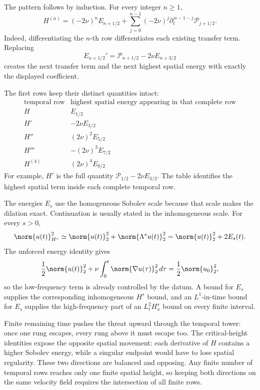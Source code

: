 The pattern follows by induction.
For every integer \(n\geq1\),
\[
  H^{(n)}
  =
  (-2\nu)^nE_{n+1/2}
  +
  \sum_{j=0}^{n-1}
  (-2\nu)^j
  \partial_t^{\,n-1-j}\mathcal P_{j+1/2}.
\]
Indeed, differentiating the \(n\)-th row differentiates each existing transfer term.
Replacing
\[
  E_{n+1/2}'
  =
  \mathcal P_{n+1/2}
  -2\nu E_{n+3/2}
\]
creates the next transfer term and the next highest spatial energy with exactly the displayed coefficient.

The first rows keep their distinct quantities intact:
\[
  \begin{array}{c|c}
    \text{temporal row}
    &
    \text{highest spatial energy appearing in that complete row}
    \\
    \hline
    H
    &
    E_{1/2}
    \\
    H'
    &
    -2\nu E_{3/2}
    \\
    H''
    &
    (2\nu)^2E_{5/2}
    \\
    H'''
    &
    -(2\nu)^3E_{7/2}
    \\
    H^{(4)}
    &
    (2\nu)^4E_{9/2}
  \end{array}
\]
For example, \(H'\) is the full quantity \(\mathcal P_{1/2}-2\nu E_{3/2}\).
The table identifies the highest spatial term inside each complete temporal row.

The energies \(E_s\) use the homogeneous Sobolev scale because that scale makes the dilation exact.
Continuation is usually stated in the inhomogeneous scale.
For every \(s>0\),
\[
  \norm{u(t)}_{H^s}^2
  \simeq
  \norm{u(t)}_2^2
  +
  \norm{\Lambda^su(t)}_2^2
  =
  \norm{u(t)}_2^2+2E_s(t).
\]
The unforced energy identity gives
\[
  \frac12\norm{u(t)}_2^2
  +
  \nu\int_0^t\norm{\nabla u(\tau)}_2^2\,d\tau
  =
  \frac12\norm{u_0}_2^2,
\]
so the low-frequency term is already controlled by the datum.
A bound for \(E_s\) supplies the corresponding inhomogeneous \(H^s\) bound, and an \(L^1\)-in-time bound for \(E_s\) supplies the high-frequency part of an \(L^2_tH^s_x\) bound on every finite interval.

Finite remaining time pushes the threat upward through the temporal tower: once one rung escapes, every rung above it must escape too.
The critical-height identities expose the opposite spatial movement: each derivative of \(H\) contains a higher Sobolev energy, while a singular endpoint would have to lose spatial regularity.
These two directions are balanced and opposing.
Any finite number of temporal rows reaches only one finite spatial height, so keeping both directions on the same velocity field requires the intersection of all finite rows.

